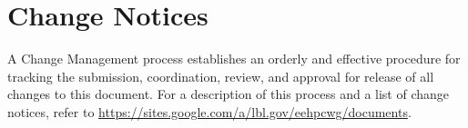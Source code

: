 \chapter{Change Notices}
\label{sec:changenotices}

\noindent
A Change Management process establishes an orderly and effective procedure for tracking the submission, coordination, review, and approval for release of all changes to this document. For a description of this process and a list of change notices, refer to 
\url{https://sites.google.com/a/lbl.gov/eehpcwg/documents}.
